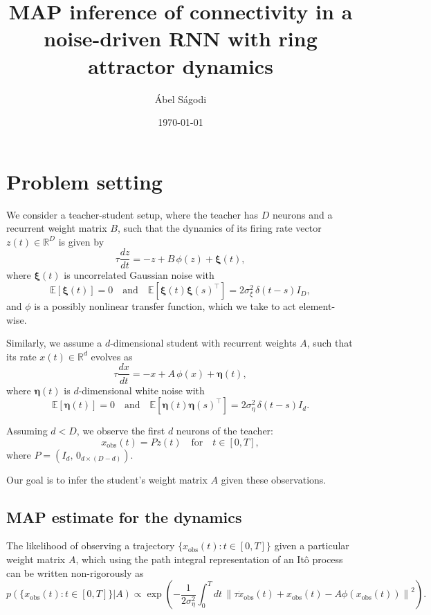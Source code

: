 \documentclass{article}
\title{MAP inference of connectivity in a noise-driven RNN with ring attractor dynamics}
\author{\'Abel S\'agodi}
\date{\today}
\theoremstyle{definition} \newtheorem{definition}{Definition}
\theoremstyle{remark} \newtheorem{remark}{Remark}
\newcounter{ct}
\begin{document}
\maketitle

\section{Problem setting}
We consider a teacher-student setup, where the teacher has \( D \) neurons and a recurrent weight matrix \( B \), such that the dynamics of its firing rate vector \( z(t) \in \mathbb{R}^D \) is given by
\[
\tau \frac{d z}{dt} = -z + B \, \phi(z) + \boldsymbol{\xi}(t),
\]
where \( \boldsymbol{\xi}(t) \) is uncorrelated Gaussian noise with 
\[
\mathbb{E}[\boldsymbol{\xi}(t)] = 0 \quad \text{and} \quad \mathbb{E}[\boldsymbol{\xi}(t) \boldsymbol{\xi}(s)^\top] = 2 \sigma^2_{\xi} \, \delta(t - s) I_D,
\]
and \( \phi \) is a possibly nonlinear transfer function, which we take to act element-wise.



Similarly, we assume a \( d \)-dimensional student with recurrent weights \( A \), such that its rate \( x(t) \in \mathbb{R}^d \) evolves as
\[
\tau \frac{d x}{dt} = -x + A \, \phi(x) + \boldsymbol{\eta}(t),
\]
where \( \boldsymbol{\eta}(t) \) is \( d \)-dimensional white noise with
\[
\mathbb{E}[\boldsymbol{\eta}(t)] = 0 \quad \text{and} \quad \mathbb{E}[\boldsymbol{\eta}(t) \boldsymbol{\eta}(s)^\top] = 2 \sigma^2_{\eta} \, \delta(t - s) I_d.
\]

Assuming \( d < D \), we observe the first \( d \) neurons of the teacher:
\[
x_{\text{obs}}(t) = P z(t) \quad \text{for} \quad t \in [0, T],
\]
where \( P = (I_d, \, 0_{d \times (D - d)}) \).

Our goal is to infer the student’s weight matrix \( A \) given these observations.


\subsection{MAP estimate for the dynamics}

The likelihood of observing a trajectory \(\{x_{\text{obs}}(t) : t \in [0, T]\}\) given a particular weight matrix \( A \), which using the path integral representation of an Itô process can be written non-rigorously as  
\[
p(\{x_{\text{obs}}(t) : t \in [0, T]\} | A) \propto \exp \left( -\frac{1}{2\sigma^2_{\eta}} \int_0^T dt \, \left\| \tau \dot{x}_{\text{obs}}(t) + x_{\text{obs}}(t) - A \phi(x_{\text{obs}}(t)) \right\|^2 \right).
\]
\end{document}
